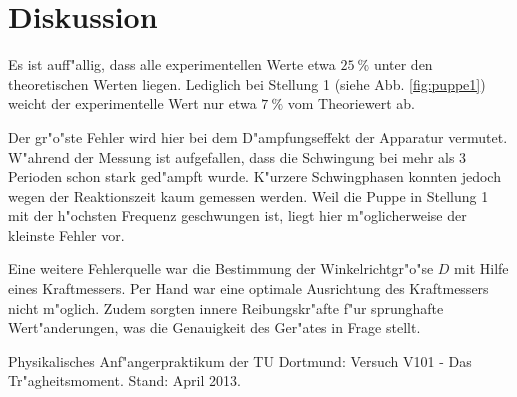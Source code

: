 \section{Diskussion}
\label{diskussion}
Es ist auff"allig, dass alle experimentellen Werte etwa $\SI{25}{\percent}$ unter den theoretischen Werten liegen.
Lediglich bei Stellung 1 (siehe Abb. \ref{fig:puppe1}) weicht der experimentelle Wert nur etwa $\SI{7}{\percent}$ vom Theoriewert ab.

Der gr"o"ste Fehler wird hier bei dem D"ampfungseffekt der Apparatur vermutet.
W"ahrend der Messung ist aufgefallen, dass die Schwingung bei mehr als 3 Perioden schon stark ged"ampft wurde.
K"urzere Schwingphasen konnten jedoch wegen der Reaktionszeit kaum gemessen werden.
Weil die Puppe in Stellung 1 mit der h"ochsten Frequenz geschwungen ist, liegt hier m"oglicherweise der kleinste Fehler vor.


Eine weitere Fehlerquelle war die Bestimmung der Winkelrichtgr"o"se $D$ mit Hilfe eines Kraftmessers.
Per Hand war eine optimale Ausrichtung des Kraftmessers nicht m"oglich.
Zudem sorgten innere Reibungskr"afte f"ur sprunghafte Wert"anderungen, was die Genauigkeit des Ger"ates in Frage stellt.
	

\begin{thebibliography}{9}
	 Physikalisches Anf"angerpraktikum der TU Dortmund: Versuch V101 - Das Tr"agheitsmoment. Stand: April 2013.
\end{thebibliography}
